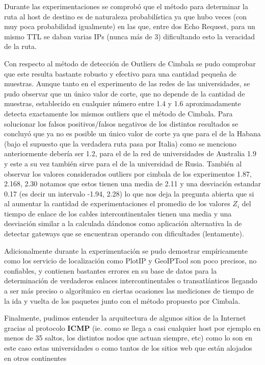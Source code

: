 Durante las experimentaciones se comprobó que el método para determinar la ruta
al host de destino es de naturaleza probabilística ya que hubo veces (con muy
poca probabilidad igualmente) en las que, entre dos Echo Request, para un mismo
TTL se daban varias IPs (nunca más de 3) dificultando esto la veracidad de la
ruta.

Con respecto al método de detección de Outliers de Cimbala se pudo comprobar
que este resulta bastante robusto y efectivo para una cantidad pequeña de
muestras. Aunque tanto en el experimento de las redes de las universidades, se pudo observar que
un único valor de corte, que no depende de la cantidad de muestras, establecido en cualquier número
entre 1.4 y 1.6 aproximadamente detecta exactamente los mismos outliers que el
método de Cimbala. Para solucionar los falsos positivos/falsos negativos de los
distintos resultados se concluyó que ya no es posible un único valor de corte ya
que para el de la Habana (bajo el supuesto que la verdadera ruta pasa por
Italia) como se menciono anteriormente debería ser 1.2, para el de la red de
universidades de Australia 1.9 y este a su vez también sirve para el de la
universidad de Rusia. También al observar los valores considerados outliers por cimbala
de los experimentos 1.87, 2.168, 2.30 notamos que estos tienen una media de 2.11
y una desviación estandar 0.17 (es decir un intervalo -1.94, 2.28) lo que nos
deja la pregunta abierta que si al aumentar la cantidad de experimentaciones
el promedio de los valores $Z_i$ del tiempo de enlace de los cables intercontinentales
tienen una media y una desviación similar a la calculada dándonos como aplicación
alternativa la de detectar gateways que se encuentran operando con dificultades (lentamente).

Adicionalmente durante la experimentación se pudo demostrar empíricamente como los servicio
de localización como PlotIP y GeoIPTool son poco precisos, no confiables, y contienen bastantes
errores en su base de datos para la determinación de verdaderos enlaces intercontinentales o
transatlánticos llegando a ser más preciso o algorítmico en ciertas ocasiones las mediciones de tiempo
de la ida y vuelta de los paquetes junto con el método propuesto por Cimbala.

Finalmente, pudimos entender la arquitectura de algunos sitios de la Internet gracias al protocolo \textbf{ICMP} (ie. como se llega a casi
cualquier host por ejemplo en menos de 35 saltos, los distintos nodos que actuan siempre, etc) como lo son en este caso
estas universidades o como tantos de los sitios web que están alojados en otros
continentes
